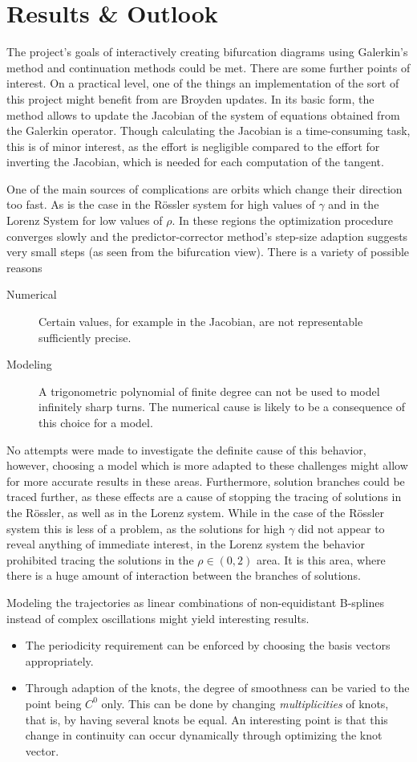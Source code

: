 \section{Results \& Outlook}

The project's goals of interactively creating bifurcation diagrams using Galerkin's method and continuation methods could be met.
There are some further points of interest.
On a practical level, one of the things an implementation of the sort of this project might benefit from are Broyden updates.
In its basic form, the method allows to update the Jacobian of the system of equations obtained from the Galerkin operator.
Though calculating the Jacobian is a time-consuming task, this is of minor interest, as the effort is negligible compared to the effort for inverting the Jacobian, which is needed for each computation of the tangent.

One of the main sources of complications are orbits which change their direction too fast.
As is the case in the Rössler system for high values of $\gamma$ and in the Lorenz System for low values of $\rho$. %
In these regions the optimization procedure converges slowly and the predictor-corrector method's step-size adaption suggests very small steps (as seen from the bifurcation view).
There is a variety of possible reasons
\begin{description}
	\item[Numerical] Certain values, for example in the Jacobian, are not representable sufficiently precise.
	\item[Modeling] A trigonometric polynomial of finite degree can not be used to model infinitely sharp turns.
		The numerical cause is likely to be a consequence of this choice for a model.
\end{description}
No attempts were made to investigate the definite cause of this behavior, however, choosing a model which is more adapted to these challenges might allow for more accurate results in these areas.
Furthermore, solution branches could be traced further, as these effects are a cause of stopping the tracing of solutions in the Rössler, as well as in the Lorenz system. %
While in the case of the Rössler system this is less of a problem, as the solutions for high $\gamma$ did not appear to reveal anything of immediate interest, in the Lorenz system the behavior prohibited tracing the solutions in the $\rho \in (0,2)$ area.
It is this area, where there is a huge amount of interaction between the branches of solutions.

Modeling the trajectories as linear combinations of non-equidistant B-splines instead of complex oscillations might yield interesting results. %
\begin{itemize}
	\item The periodicity requirement can be enforced by choosing the basis vectors appropriately.
	\item Through adaption of the knots, the degree of smoothness can be varied to the point being $C^0$ only.
		This can be done by changing \emph{multiplicities} of knots, that is, by having several knots be equal.
		An interesting point is that this change in continuity can occur dynamically through optimizing the knot vector.
\end{itemize}